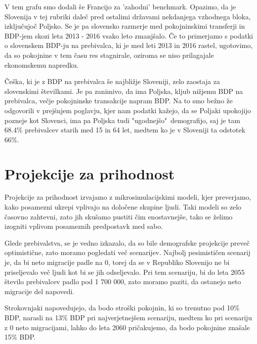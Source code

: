 \documentclass[12pt, a4paper]{article}
\begin{document}
\newpage
\hspace*{5mm} V tem grafu smo dodali še Francijo za 'zahodni' benchmark. Opazimo, da je Slovenija v tej rubriki daleč pred ostalimi državami nekdanjega vzhodnega bloka, izključujoč Poljsko. Se je pa slovensko razmerje med pokojninskimi transferji in BDP-jem skozi leta 2013 - 2016 vsako leto zmanjšalo. Če to primerjamo s podatki o slovenskem BDP-ju na prebivalca, ki je med leti 2013 in 2016 rastel, ugotovimo, da so pokojnine v tem času res stagnirale, oziroma se niso prilagajale ekonomskemu napredku.

\hspace*{5mm} Češka, ki je z BDP na prebivalca še najbližje Sloveniji, zelo zaostaja za slovenskimi številkami. Je pa zanimivo, da ima Poljska, kljub nižjemu BDP na prebivalca, večje pokojninske transakcije napram BDP. Na to smo bežno že odgovorili v prejšnjem poglavju, kjer nam podatki kažejo, da se Poljaki upokojijo pozneje kot Slovenci, ima pa Poljska tudi "ugodnejšo"~demografijo, saj je tam 68.4\% prebivalcev starih med 15 in 64 let, medtem ko je v Sloveniji ta odstotek 66\%.

\newpage

\section[Projekcije za prihodnost]{Projekcije za prihodnost}

\hspace*{5mm} Projekcije za prihodnost izvajamo z mikrosimulacijskimi modeli, kjer preverjamo, kako posamezni ukrepi vplivajo na določene skupine ljudi. Taki modeli so zelo časovno zahtevni, zato jih skušamo pustiti čim enostavnejše, tako se želimo izogniti vplivom posameznih predpostavk med sabo.

\hspace*{5mm} Glede prebivalstva, se je vedno izkazalo, da so bile demografske projekcije preveč optimistične, zato moramo pogledati več scenarijev. Najbolj pesimističen scenarij je, da bi neto migracije padle na 0, torej da se v Republiko Slovenijo ne bi priseljevalo več ljudi kot bi se jih odseljevalo. Pri tem scenariju, bi do leta 2055 število prebivalcev padlo pod 1 700 000, zato moramo paziti, da ostanejo neto migracije del napovedi.

\hspace*{5mm} Strokovnjaki napovedujejo, da bodo stroški pokojnin, ki so trenutno pod 10\% BDP, narasli na 13\% BDP pri najverjetnejšem scenariju, medtem ko pri scenariju z 0 neto migracijami, lahko do leta 2060 pričakujemo, da bodo pokojnine znašale 15\% BDP.
\end{document}
